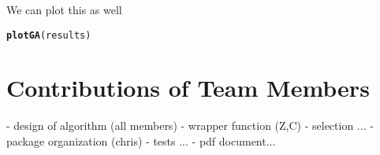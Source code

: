 \documentclass{article}\usepackage[]{graphicx}\usepackage[]{color}
\makeatletter
\newcommand{\hlstd}[1]{\textcolor[rgb]{0.345,0.345,0.345}{#1}}%
\newcommand{\hlkwd}[1]{\textcolor[rgb]{0.737,0.353,0.396}{\textbf{#1}}}%
\newenvironment{kframe}{%
 \def\at@end@of@kframe{}%
 \ifinner\ifhmode%
  \def\at@end@of@kframe{\end{minipage}}%
  \begin{minipage}{\columnwidth}%
 \fi\fi%
 \def\FrameCommand##1{\hskip\@totalleftmargin \hskip-\fboxsep
 \colorbox{shadecolor}{##1}\hskip-\fboxsep
     \hskip-\linewidth \hskip-\@totalleftmargin \hskip\columnwidth}%
 \MakeFramed {\advance\hsize-\width
   \@totalleftmargin\z@ \linewidth\hsize
   \@setminipage}}%
 {\par\unskip\endMakeFramed%
 \at@end@of@kframe}
\newenvironment{knitrout}{}{} %
\makeatother
\begin{document}
We can plot this as well
\begin{knitrout}
\color{fgcolor}\begin{kframe}
\begin{alltt}
\hlkwd{plotGA}\hlstd{(results)}
\end{alltt}


{\ttfamily\noindent\bfseries{}}\end{kframe}
\end{knitrout}



\section*{Contributions of Team Members}
- design of algorithm (all members)
- wrapper function (Z,C)
- selection ...
- package organization (chris)
- tests ...
- pdf document...
\end{document}
